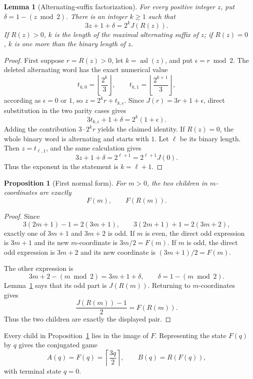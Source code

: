 \documentclass[11pt,a4paper]{article}
\newtheorem{proposition}[theorem]{Proposition}
\newtheorem{lemma}[theorem]{Lemma}
\theoremstyle{definition}
\theoremstyle{remark}
\newcommand{\asl}{\operatorname{asl}}
\begin{document}
\begin{lemma}[Alternating-suffix factorization]\label{lem:alt-factor}
For every positive integer $z$, put $\delta=1-(z\bmod2)$.  There is an
integer $k\ge1$ such that
\[
  3z+1+\delta=2^k J(R(z)).
\]
If $R(z)>0$, $k$ is the length of the maximal alternating suffix of $z$;
if $R(z)=0$, $k$ is one more than the binary length of $z$.
\end{lemma}

\begin{proof}
First suppose $r=R(z)>0$, let $k=\asl(z)$, and put
$\epsilon=r\bmod2$.  The deleted alternating word has the exact numerical
value
\[
 t_{k,0}=\left\lfloor\frac{2^k}{3}\right\rfloor,
 \qquad
 t_{k,1}=\left\lfloor\frac{2^{k+1}}{3}\right\rfloor,
\]
according as $\epsilon=0$ or $1$, so $z=2^k r+t_{k,\epsilon}$.
Since $J(r)=3r+1+\epsilon$, direct substitution in the two parity cases
gives
\[
  3t_{k,\epsilon}+1+\delta=2^k(1+\epsilon).
\]
Adding the contribution $3\cdot2^k r$ yields the claimed identity.
If $R(z)=0$, the whole binary word is alternating and starts with $1$.
Let $\ell$ be its binary length.  Then $z=t_{\ell,1}$, and the same
calculation gives
\[
  3z+1+\delta=2^{\ell+1}=2^{\ell+1}J(0).
\]
Thus the exponent in the statement is $k=\ell+1$.
\end{proof}

\begin{proposition}[First normal form]\label{prop:first-normal}
For $m>0$, the two children in $m$-coordinates are exactly
\[
  F(m),\qquad F(R(m)).
\]
\end{proposition}

\begin{proof}
Since
\[
  3(2m+1)-1=2(3m+1),\qquad
  3(2m+1)+1=2(3m+2),
\]
exactly one of $3m+1$ and $3m+2$ is odd.  If $m$ is even, the direct odd
expression is $3m+1$ and its new $m$-coordinate is $3m/2=F(m)$.  If $m$
is odd, the direct odd expression is $3m+2$ and its new coordinate is
$(3m+1)/2=F(m)$.

The other expression is
\[
  3m+2-(m\bmod2)=3m+1+\delta,
  \qquad \delta=1-(m\bmod2).
\]
Lemma~\ref{lem:alt-factor} says that its odd part is $J(R(m))$.  Returning
to $m$-coordinates gives
\[
  \frac{J(R(m))-1}{2}=F(R(m)).
\]
Thus the two children are exactly the displayed pair.
\end{proof}

Every child in Proposition~\ref{prop:first-normal} lies in the image of
$F$.  Representing the state $F(q)$ by $q$ gives the conjugated game
\[
  A(q)=F(q)=\left\lceil\frac{3q}{2}\right\rceil,
  \qquad
  B(q)=R(F(q)),
\]
with terminal state $q=0$.
\end{document}
